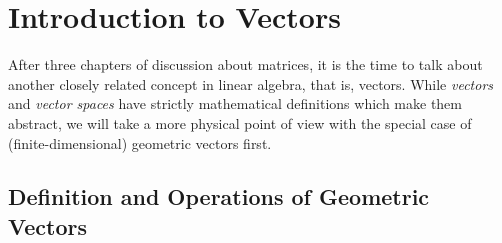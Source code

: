 \chapter{Introduction to Vectors}

After three chapters of discussion about matrices, it is the time to talk about another closely related concept in linear algebra, that is, vectors. While \textit{vectors} and \textit{vector spaces} have strictly mathematical definitions which make them abstract, we will take a more physical point of view with the special case of (finite-dimensional) geometric vectors first.

\section{Definition and Operations of Geometric Vectors}


